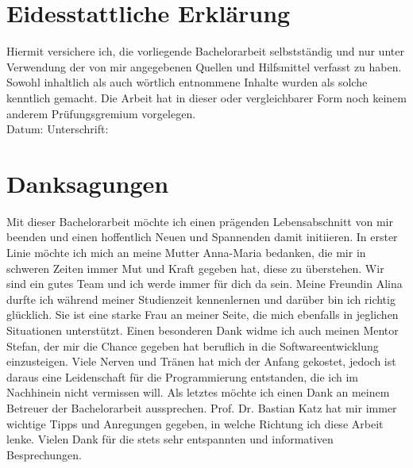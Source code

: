 \setcounter{secnumdepth}{0}
\section{Eidesstattliche Erklärung}

Hiermit versichere ich, die vorliegende Bachelorarbeit selbstständig und nur unter Verwendung der von mir angegebenen Quellen und Hilfsmittel verfasst zu haben. Sowohl inhaltlich als auch wörtlich entnommene Inhalte wurden als solche kenntlich gemacht. Die Arbeit hat in dieser oder vergleichbarer Form noch keinem anderem Prüfungsgremium vorgelegen.
\\[1.5cm]
Datum:	\hrulefill\enspace Unterschrift: \hrulefill


\newpage

\section{Danksagungen}
Mit dieser Bachelorarbeit möchte ich einen prägenden Lebensabschnitt von mir beenden und einen hoffentlich Neuen und Spannenden damit initiieren. In erster Linie möchte ich mich an meine Mutter Anna-Maria bedanken, die mir in schweren Zeiten immer Mut und Kraft gegeben hat, diese zu überstehen. Wir sind ein gutes Team und ich werde immer für dich da sein. Meine Freundin Alina durfte ich während meiner Studienzeit kennenlernen und darüber bin ich richtig glücklich. Sie ist eine starke Frau an meiner Seite, die mich ebenfalls in jeglichen Situationen unterstützt. Einen besonderen Dank widme ich auch meinen Mentor Stefan, der mir die Chance gegeben hat beruflich in die Softwareentwicklung einzusteigen. Viele Nerven und Tränen hat mich der Anfang gekostet, jedoch ist daraus eine Leidenschaft für die Programmierung entstanden, die ich im Nachhinein nicht vermissen will. Als letztes möchte ich einen Dank an meinem Betreuer der Bachelorarbeit aussprechen. Prof. Dr. Bastian Katz hat mir immer wichtige Tipps und Anregungen gegeben, in welche Richtung ich diese Arbeit lenke. Vielen Dank für die stets sehr entspannten und informativen Besprechungen.
